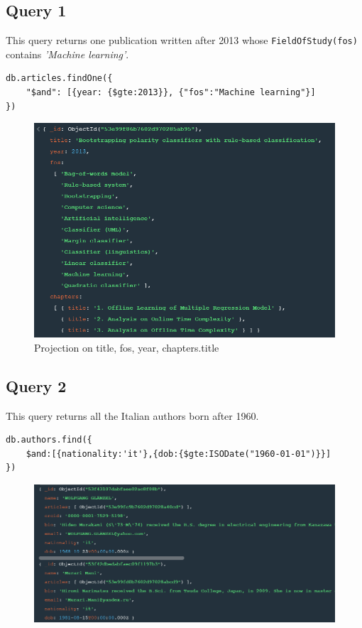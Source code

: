 \documentclass{Configuration_Files/PoliMi3i_thesis}
\begin{document}
\subsection{Query 1}
This query returns one publication written after 2013 whose \verb |FieldOfStudy(fos)| contains \emph{'Machine learning'}.
\begin{lstlisting}
db.articles.findOne({
	"$and": [{year: {$gte:2013}}, {"fos":"Machine learning"}]
})
\end{lstlisting}
\begin{figure}[H]
\centering
\includegraphics[width=1\textwidth]{query/mongo_q1.PNG}
\caption{Projection on title, fos, year, chapters.title}
\label{fig:query1}
\end{figure}

\subsection{Query 2}
This query returns all the Italian authors born after 1960.
\begin{lstlisting}
db.authors.find({
	$and:[{nationality:'it'},{dob:{$gte:ISODate("1960-01-01")}}]
})
\end{lstlisting}
\begin{figure}[H]
\centering
\includegraphics[width=1\textwidth]{query/mongo_q2.PNG}
\label{fig:query2}
\end{figure}
\end{document}
